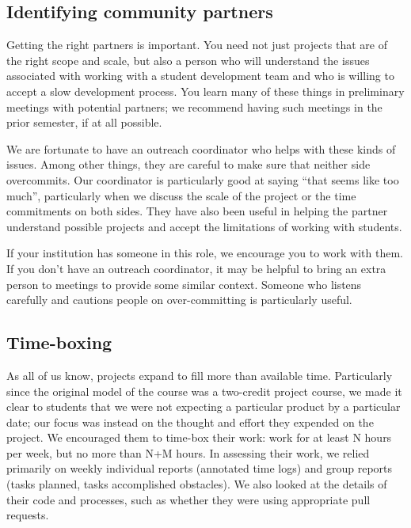 \subsection{Identifying community partners}

Getting the right partners is important.  You need not just projects that
are of the right scope and scale, but also a person who will understand
the issues associated with working with a student development team and
who is willing to accept a slow development process.  You learn many of
these things in preliminary meetings with potential partners; we recommend
having such meetings in the prior semester, if at all possible.

We are fortunate to have an outreach coordinator who helps with these kinds
of issues.  Among other things, they are careful to make sure that neither
side overcommits.  Our coordinator is particularly good at saying ``that
seems like too much'', particularly when we discuss the scale of the project
or the time commitments on both sides.  They have also been useful in
helping the partner understand possible projects and accept the limitations
of working with students.

If your institution has someone in this role, we encourage you to work with
them.  If you don't have an outreach coordinator, it may be helpful to
bring an extra person to meetings to provide some similar context.  Someone
who listens carefully and cautions people on over-committing is particularly
useful.

\subsection{Time-boxing}

As all of us know, projects expand to fill more than available time.
Particularly since the original model of the course was a two-credit
project course, we made it clear to students that we were not expecting
a particular product by a particular date; our focus was instead on the
thought and effort they expended on the project.  We encouraged them
to time-box their work: work for at least N hours per week, but no more
than N+M hours.  In assessing their work, we relied primarily on
weekly individual reports (annotated time logs) and group reports
(tasks planned, tasks accomplished obstacles).  We also looked at the
details of their code and processes, such as whether they were using
appropriate pull requests.

